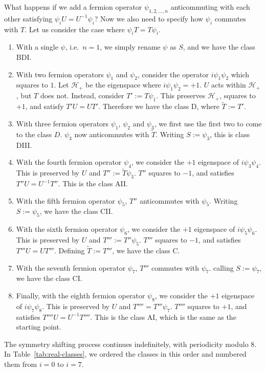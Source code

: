 \documentclass[12pt]{article}
\numberwithin{equation}{section}
\numberwithin{figure}{section}
\theoremstyle{remark}
\def\cH{\mathcal{H}}
\begin{document}
What happens if we add a fermion operator $\psi_{1,2,\ldots,n}$
anticommuting with each other satisfying $\psi_i U=U^{-1}\psi_i$?
Now we also need to specify how $\psi_i$ commutes with $T$.
Let us consider the case where $\psi_i T = T\psi_i$.
\begin{enumerate}
\item With a single $\psi$, i.e.~$n=1$, we simply rename $\psi$ as $S$,
and we have the class BDI.
\item With two fermion operators $\psi_1$ and $\psi_2$,
consider the operator $i\psi_1\psi_2$ which squares to $1$.
Let $\cH_+$ be the eigenspace where $i\psi_1\psi_2=+1$.
$U$ acts within $\cH_+$, but $T$ does not. 
Instead, consider $T':=T\psi_1$. 
This preserves  $\cH_+$, squares to $+1$, and satisfy $T'U=UT'$.
Therefore we have the class D, where $\tilde T:=T'$.
\item With three fermion operators $\psi_1$, $\psi_2$ and $\psi_3$,
we first use the first two to come to the class $D$.
$\psi_3$ now anticommutes with $\tilde T$.
Writing $S:=\psi_3$, this is class DIII.
\item With the fourth fermion operator $\psi_4$, we consider the $+1$ eigenspace of
$i\psi_3\psi_4$. This is preserved by $U$ and $T'':=\tilde T\psi_3$.
$T''$ squares to $-1$, and satisfies $T''U=U^{-1}T''$.
This is the class AII.
\item With the fifth fermion operator $\psi_5$, $T''$ anticommutes with $\psi_5$.
Writing $S:=\psi_5$, we have the class CII.
\item With the sixth fermion operator $\psi_6$, we consider the $+1$ eigenspace of
$i\psi_5\psi_6$.
This is preserved by $U$ and $T''':=T''\psi_5$. 
$T'''$ squares to $-1$, and satisfies $T'''U=U T'''$.
Defining $\tilde T:=T'''$, we have the class C.
\item With the seventh fermion operator $\psi_7$, $T'''$ commutes with $\psi_7$.
calling $S:=\psi_7$, we have the class CI.
\item Finally, with the eighth fermion operator $\psi_8$, we consider the $+1$ eigenspace of
$i\psi_7\psi_8$.
This is preserved by $U$ and $T''''=T'''\psi_7$.
$T''''$ squares to $+1$, and satisfies $T''''U=U^{-1}T''''$.
This is the class AI, which is the same as the starting point.
\end{enumerate}

The symmetry shifting process continues indefinitely, with periodicity modulo 8.
In Table~\ref{tab:real-classes}, we ordered the classes in this order and numbered them from $i=0$ to $i=7$.
\end{document}
